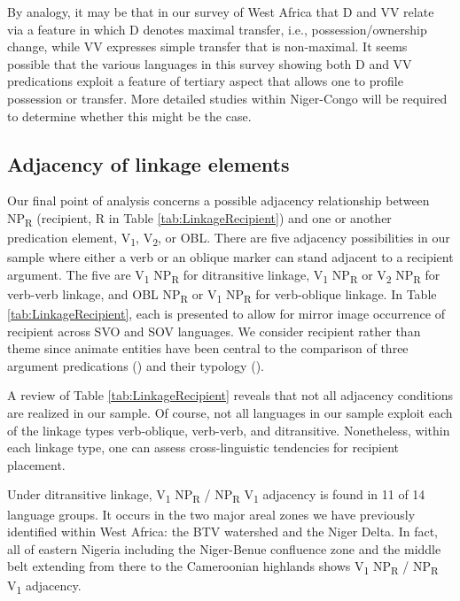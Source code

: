 \documentclass[output=paper,colorlinks,citecolor=brown]{langscibook}
\begin{document}
By analogy, it may be that in our survey of West Africa that D and VV relate via a feature in which D denotes maximal transfer, i.e., possession/ownership change, while VV expresses  simple transfer that is non-maximal. It seems possible that the various languages in this survey showing both D and VV predications exploit a feature of tertiary aspect that allows one to profile possession or transfer. More detailed studies within Niger-Congo will be required to determine whether this might be the case.

\subsection{Adjacency of linkage elements}

Our final point of analysis concerns a possible adjacency relationship between NP\textsubscript{R} (recipient, R in Table \ref{tab:LinkageRecipient}) and one or another predication element, V\textsubscript{1}, V\textsubscript{2}, or OBL. There are five adjacency possibilities in our sample where either a verb or an oblique marker can stand adjacent to a recipient argument. The five are V\textsubscript{1} NP\textsubscript{R} for ditransitive linkage, V\textsubscript{1} NP\textsubscript{R} or V\textsubscript{2} NP\textsubscript{R} for verb-verb linkage, and OBL NP\textsubscript{R} or V\textsubscript{1} NP\textsubscript{R} for verb-oblique linkage. In Table \ref{tab:LinkageRecipient}, each is presented to allow for mirror image occurrence of recipient across SVO and SOV languages. We consider recipient rather than theme since animate entities have been central to the comparison of three argument predications (\cite{Gruber1992}) and their typology (\citealt{Kittilä2006, MargettsAustin2007}).

A review of Table \ref{tab:LinkageRecipient} reveals that not all adjacency conditions are realized in our sample. Of course, not all languages in our sample exploit each of the linkage types verb-oblique, verb-verb, and ditransitive. Nonetheless, within each linkage type, one can assess cross-linguistic tendencies for recipient placement.

Under ditransitive linkage, V\textsubscript{1} NP\textsubscript{R} / NP\textsubscript{R} V\textsubscript{1} adjacency is found in 11 of 14 language groups. It occurs in the two major areal zones we have previously identified within West Africa: the BTV watershed and the Niger Delta. In fact, all of eastern Nigeria including the Niger-Benue confluence zone and the middle belt extending from there to the Cameroonian highlands shows V\textsubscript{1} NP\textsubscript{R} / NP\textsubscript{R} V\textsubscript{1} adjacency.
\end{document}
